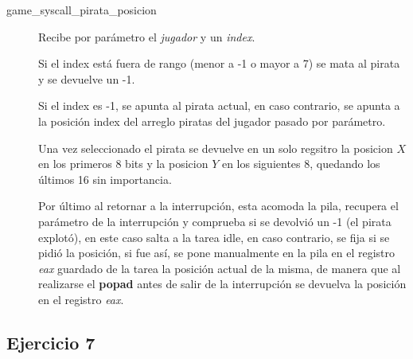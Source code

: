 \begin{description}
\item[game_syscall_pirata_posicion] Recibe por parámetro el {\it jugador\/} y un
{\it index\/}.

Si el index está fuera de rango (menor a -1 o mayor a 7) se mata al pirata y se
devuelve un -1.

Si el index es -1, se apunta al pirata actual, en caso contrario, se apunta a la
posición index del arreglo piratas del jugador pasado por parámetro.

Una vez seleccionado el pirata se devuelve en un solo regsitro la posicion $X$
en los primeros 8 bits y la posicion $Y$ en los siguientes 8, quedando los
últimos 16 sin importancia.

Por último al retornar a la interrupción, esta acomoda la pila, recupera el
parámetro de la interrupción y comprueba si se devolvió un -1
(el pirata explotó), en este caso salta a la tarea idle, en caso contrario, se
fija si se pidió la posición, si fue así, se pone manualmente en la pila en el
registro {\it eax\/} guardado de la tarea la posición actual de la misma, de
manera que al realizarse el {\bf popad} antes de salir de la interrupción se
devuelva la posición en el registro {\it eax\/}.
\end{description}

\subsection{Ejercicio 7}

